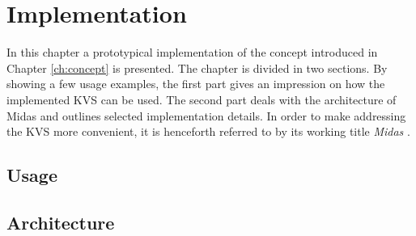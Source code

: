 \chapter{Implementation}
\label{ch:impl}

In this chapter a prototypical implementation of the concept introduced in
Chapter \ref{ch:concept} is presented. The chapter is divided in two sections.
By showing a few usage examples, the first part gives an impression on how the
implemented \ac{KVS} can be used. The second part deals with the architecture of
Midas and outlines selected implementation details. In order to make addressing
the \ac{KVS} more convenient, it is henceforth referred to by its working title
\emph{Midas} \footnotemark.


\section{Usage}
\label{ch:impl-usage}


\clearpage

\section{Architecture}
\label{ch:impl-arch}

